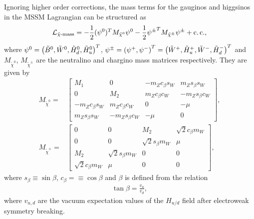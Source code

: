 \documentclass[../main.tex]{subfiles}
\begin{document}
Ignoring higher order corrections, the mass terms for the gauginos and higgsinos in the MSSM Lagrangian can be structured as
\begin{equation}
  \mathcal{L}_{\tilde\chi\text{-mass}} = -\frac{1}{2}(\psi^0)^T M_{\tilde\chi^0} \psi^0 - \frac{1}{2}{\psi^\pm}^T M_{\tilde\chi^\pm} \psi^\pm + \operatorname{c.c.},
\end{equation}
where \(\psi^0 = \left(\tilde{B}^0, \tilde{W}^0, \tilde{H}^0_d, \tilde{H}^0_u\right)^T\), \(\psi^\pm = \left(\psi^+, \psi^-\right)^T = \left(\tilde{W}^+, \tilde{H}_u^+, \tilde{W}^-, \tilde{H}_d^-\right)^T\) and \(M_{\tilde\chi^0}\), \(M_{\tilde\chi^\pm}\) are the neutralino and chargino mass matrices respectively.
They are given by
\begin{align}
  \label{susy:eq:neutralino_mixing_matrix}
  M_{\tilde\chi^0} =   & \begin{bmatrix}
                           M_1              & 0                & -m_Z c_\beta s_W & m_Z s_\beta s_W  \\
                           0                & M_2              & m_Z c_\beta c_W  & -m_Z s_\beta c_W \\
                           -m_Z c_\beta s_W & m_Z c_\beta c_W  & 0                & -\mu             \\
                           m_Z s_\beta s_W  & -m_Z s_\beta c_W & -\mu             & 0
                         \end{bmatrix},             \\
  \label{susy:eq:chargino_mixing_matrix}
  M_{\tilde\chi^\pm} = & \begin{bmatrix}
                           0                   & 0                   & M_2                 & \sqrt{2}c_\beta m_W \\
                           0                   & 0                   & \sqrt{2}s_\beta m_W & \mu                 \\
                           M_2                 & \sqrt{2}s_\beta m_W & 0                   & 0                   \\
                           \sqrt{2}c_\beta m_W & \mu                 & 0                   & 0
                         \end{bmatrix},
\end{align}
where \(s_\beta \equiv \sin\beta\), \(c_\beta = \equiv \cos\beta\) and \(\beta\) is defined from the relation
\begin{eqnarray}
  \tan\beta = \frac{v_u}{v_d},
\end{eqnarray}
where \(v_{u,d}\) are the vacuum expectation values of the \(H_{u/d}\) field after electroweak symmetry breaking.
\end{document}
